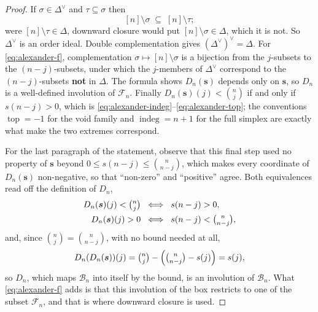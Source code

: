 \documentclass[11pt, a4paper, abstract=yes]{scrartcl}
\theoremstyle{definition}
\theoremstyle{remark}
\theoremstyle{plain}
\newcommand{\vek}[1]{\boldsymbol{#1}}
\newcommand{\indeg}{\operatorname{indeg}}
\newcommand{\tp}{\operatorname{top}}
\begin{document}
\begin{proof}
If \(\sigma\in\Delta^{\vee}\) and \(\tau\subseteq\sigma\) then
\[
  [n]\setminus\sigma\;\subseteq\;[n]\setminus\tau ;
\]
were \([n]\setminus\tau\in\Delta\), downward closure would put
\([n]\setminus\sigma\in\Delta\), which it is not. So \(\Delta^{\vee}\) is an order ideal. Double
complementation gives \((\Delta^{\vee})^{\vee}=\Delta\). For \eqref{eq:alexander-f}, complementation
\(\sigma\mapsto[n]\setminus\sigma\) is a bijection from the \(j\)-subsets to the \((n-j)\)-subsets,
under which the \(j\)-members of \(\Delta^{\vee}\) correspond to the \((n-j)\)-subsets \textbf{not} in
\(\Delta\). The formula shows \(D_n(\vek s)\) depends only on \(\vek s\), so \(D_n\) is a well-defined
involution of \(\mathcal F_n\). Finally \(D_n(\vek s)(j)<\binom nj\) if and only if \(s(n-j)>0\), which
is \eqref{eq:alexander-indeg}--\eqref{eq:alexander-top}; the conventions \(\tp=-1\) for the void family and
\(\indeg=n+1\) for the full simplex are exactly what make the two extremes correspond.

For the last paragraph of the statement, observe that this final step used no property of \(\vek s\)
beyond \(0\le s(n-j)\le\binom n{n-j}\), which makes every coordinate of \(D_n(\vek s)\)
non-negative, so that ``non-zero'' and ``positive'' agree. Both equivalences read off the definition
of \(D_n\),
\begin{align}
  D_n(\vek s)(j)<\tbinom nj \;&\iff\; s(n-j)>0 ,\label{eq:D-below}\\
  D_n(\vek s)(j)>0 \;&\iff\; s(n-j)<\tbinom n{n-j} ,\label{eq:D-above}
\end{align}
and, since \(\binom nj=\binom n{n-j}\), with no bound needed at all,
\begin{equation}\label{eq:D-involution}
  D_n(D_n(\vek s))(j)=\tbinom nj-\Bigl(\tbinom n{n-j}-s(j)\Bigr)=s(j) ,
\end{equation}
so \(D_n\), which maps \(\mathcal B_n\) into itself by the bound, is an involution of
\(\mathcal B_n\). What \eqref{eq:alexander-f} adds is that this involution of the box restricts to one of the
subset \(\mathcal F_n\), and that is where downward closure is used.
\end{proof}
\end{document}
